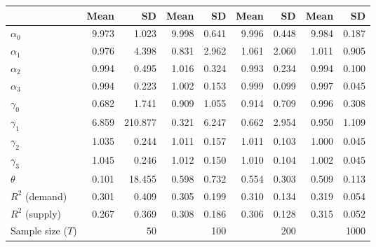 
\begin{tabular}[t]{lrrrrrrrr}
\toprule
  & Mean & SD & Mean  & SD  & Mean   & SD   & Mean    & SD   \\
\midrule
$\alpha_{0}$ & 9.973 & 1.023 & 9.998 & 0.641 & 9.996 & 0.448 & 9.984 & 0.187\\
$\alpha_{1}$ & 0.976 & 4.398 & 0.831 & 2.962 & 1.061 & 2.060 & 1.011 & 0.905\\
$\alpha_{2}$ & 0.994 & 0.495 & 1.016 & 0.324 & 0.993 & 0.234 & 0.994 & 0.100\\
$\alpha_{3}$ & 0.994 & 0.223 & 1.002 & 0.153 & 0.999 & 0.099 & 0.997 & 0.045\\
$\gamma_{0}$ & 0.682 & 1.741 & 0.909 & 1.055 & 0.914 & 0.709 & 0.996 & 0.308\\
$\gamma_{1}$ & 6.859 & 210.877 & 0.321 & 6.247 & 0.662 & 2.954 & 0.950 & 1.109\\
$\gamma_{2}$ & 1.035 & 0.244 & 1.011 & 0.157 & 1.011 & 0.103 & 1.000 & 0.045\\
$\gamma_{3}$ & 1.045 & 0.246 & 1.012 & 0.150 & 1.010 & 0.104 & 1.002 & 0.045\\
$\theta$ & 0.101 & 18.455 & 0.598 & 0.732 & 0.554 & 0.303 & 0.509 & 0.113\\
$R^{2}$ (demand) & 0.301 & 0.409 & 0.305 & 0.199 & 0.310 & 0.134 & 0.319 & 0.054\\
$R^{2}$ (supply) & 0.267 & 0.369 & 0.308 & 0.186 & 0.306 & 0.128 & 0.315 & 0.052\\
Sample size ($T$) &  & 50 &  & 100 &  & 200 &  & 1000\\
\bottomrule
\end{tabular}
